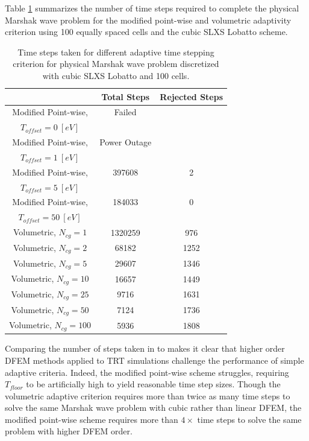 Table \ref{tbl:p3_counts} summarizes the number of time steps required to complete the physical Marshak wave problem for the modified point-wise and volumetric adaptivity criterion using 100 equally spaced cells and the cubic SLXS Lobatto scheme.
\begin{table}[!htp]
\centering
\caption{Time steps taken for different adaptive time stepping criterion for physical Marshak wave problem discretized with cubic SLXS Lobatto and 100 cells.}
\label{tbl:p3_counts}
\begin{tabular}{|c|c|c|}
\hline
{} &  Total Steps & Rejected Steps \\
\hline
Modified Point-wise, &   Failed & \\
$T_{offset} = 0~[eV]$ &    &   \\
\hline
Modified Point-wise, &   Power Outage  & \\
$T_{offset} = 1~[eV]$ &     &  \\
\hline
Modified Point-wise, &  397608  & 2\\
$T_{offset} = 5~[eV]$ &    &  \\
\hline
Modified Point-wise, &  184033  & 0\\
$T_{offset} = 50~[eV]$ &    &  \\
\hline
Volumetric, $N_{cg} = 1$ &  1320259  & 976 \\
\hline
Volumetric, $N_{cg} = 2$ & 68182   & 1252 \\
\hline
Volumetric, $N_{cg} = 5$ & 29607   & 1346 \\
\hline
Volumetric, $N_{cg} = 10$ & 16657   & 1449 \\
\hline
Volumetric, $N_{cg} = 25$ & 9716   & 1631 \\
\hline
Volumetric, $N_{cg} = 50$ & 7124   & 1736 \\
\hline
Volumetric, $N_{cg} = 100$ & 5936   & 1808 \\
\hline
\end{tabular}
\end{table}
Comparing the number of steps taken in  to  makes it clear that higher order DFEM methods applied to TRT simulations challenge the performance of simple adaptive criteria.
Indeed, the modified point-wise scheme struggles, requiring $T_{floor}$ to be artificially high to yield reasonable time step sizes.
Though the volumetric adaptive criterion requires more than twice as many time steps to solve the same Marshak wave problem with cubic rather than linear DFEM, the modified point-wise scheme requires more than $4\times$ time steps to solve the same problem with higher DFEM order. 
